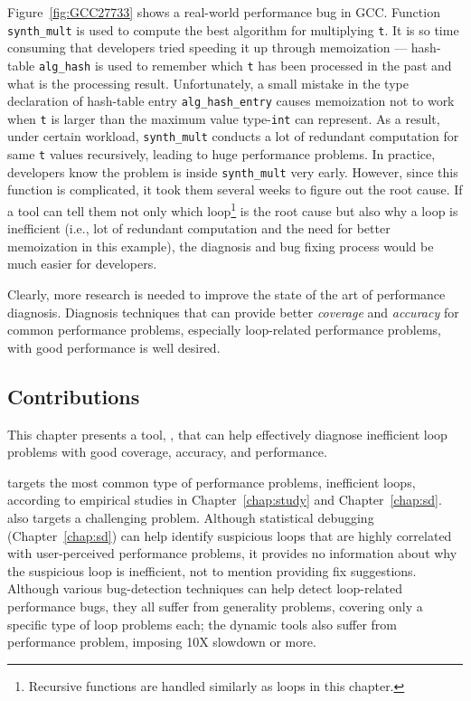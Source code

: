 Figure~\ref{fig:GCC27733} shows a real-world performance bug in GCC. 
Function \texttt{synth\_mult} is used to compute the best algorithm for 
multiplying \texttt{t}. It is so time consuming that developers tried 
speeding it up through memoization ---
hash-table
\texttt{alg\_hash} is used to remember which \texttt{t} has been processed
in the past and what is the processing result. 
Unfortunately, a small mistake in the type declaration of hash-table
entry \texttt{alg\_hash\_entry} causes memoization not to work when \texttt{t}
is larger than the maximum value type-\texttt{int} can represent.
As a result, under certain workload, \texttt{synth\_mult} conducts a lot of
redundant computation for same \texttt{t} values recursively, leading to
huge performance problems.  In practice, developers know the problem is inside
\texttt{synth\_mult} very early. However, since this function is 
complicated, it took them several weeks to figure out the root cause. 
If a tool can tell them not only which loop\footnote{Recursive functions are
handled similarly as loops in this chapter.}
is the root cause but also why a loop is inefficient (i.e., lot of redundant
computation and the need for better memoization in this example), 
the diagnosis and bug fixing
process would be much easier for developers. 

Clearly, more research is needed to improve the state of the art of performance
diagnosis. Diagnosis techniques that can provide better
\textit{coverage} and \textit{accuracy} for common performance problems,
especially loop-related performance problems, with good
performance is well desired.


\subsection{Contributions}
This chapter presents a tool, \Tool, that can help effectively diagnose
inefficient loop problems with good coverage, accuracy, and performance.

\Tool targets the most common type of performance problems, inefficient
loops, according to
empirical studies in Chapter~\ref{chap:study} and Chapter~\ref{chap:sd}.
\Tool also targets a challenging problem. Although
statistical debugging (Chapter~\ref{chap:sd})
can help identify suspicious loops that are highly correlated with 
user-perceived performance problems,
it provides no information about why the suspicious loop is inefficient,
not to mention providing fix suggestions. Although various
bug-detection techniques \citep{Cachetor,Alabama,CARAMEL} can help detect
loop-related performance bugs, they all suffer from generality problems,
covering only a specific type of loop problems each; the dynamic
tools \citep{Cachetor,Alabama} also suffer from performance
problem, imposing 10X slowdown or more.

